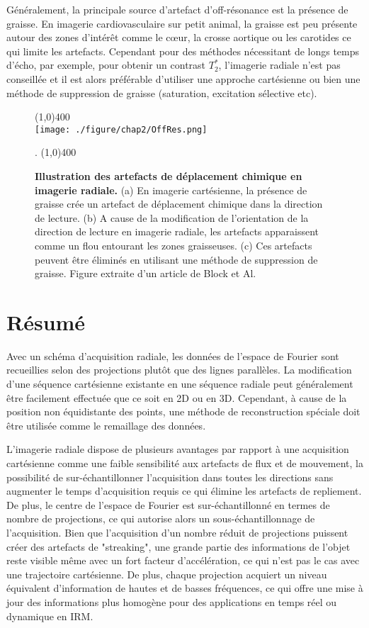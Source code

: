 Généralement, la principale source d'artefact d'off-résonance est la présence de graisse. En imagerie cardiovasculaire sur petit animal, la graisse est peu présente autour des zones d'intérêt comme le cœur, la crosse aortique ou les carotides ce qui limite les artefacts. Cependant pour des méthodes nécessitant de longs temps d'écho, par exemple, pour obtenir un contrast $T_2^*$, l'imagerie radiale n'est pas conseillée et il est alors préférable d'utiliser une approche cartésienne ou bien une méthode de suppression de graisse (saturation, excitation sélective etc).
\begin{figure}[H]
\centering
\line(1,0){400} \\
\texttt{[image: ./figure/chap2/OffRes.png]}
\caption[Illustration des artefacts de déplacement chimique en imagerie radiale.]{\label{fig:OffRes}  \textbf{Illustration des artefacts de déplacement chimique en imagerie radiale.}
(a) En imagerie cartésienne, la présence de graisse crée un artefact de déplacement chimique dans la direction de lecture. (b) A cause de la modification de l'orientation de la direction de lecture en imagerie radiale, les artefacts apparaissent comme un flou entourant les zones graisseuses. (c) Ces artefacts peuvent être éliminés en utilisant une méthode de suppression de graisse. Figure extraite d'un article de Block et Al. \cite{block2014towards}}.
\line(1,0){400} \\
\end{figure}

\section{Résumé}

Avec un schéma d'acquisition radiale, les données de l'espace de Fourier sont recueillies selon des projections plutôt que des lignes parallèles. La modification d'une séquence cartésienne existante en une séquence radiale peut généralement être facilement effectuée que ce soit en 2D ou en 3D. Cependant, à cause de la position non équidistante des points, une méthode de reconstruction spéciale doit être utilisée comme le remaillage des données.

L'imagerie radiale dispose de plusieurs avantages par rapport à une acquisition cartésienne comme une faible sensibilité aux artefacts de flux et de mouvement, la possibilité de sur-échantillonner l'acquisition dans toutes les directions sans augmenter le temps d'acquisition requis ce qui élimine les artefacts de repliement. De plus, le centre de l'espace de Fourier est sur-échantillonné en termes de nombre de projections, ce qui autorise alors un sous-échantillonnage de l'acquisition. Bien que l'acquisition d'un nombre réduit de projections puissent créer des artefacts de "streaking", une grande partie des informations de l'objet reste visible même avec un fort facteur d'accélération, ce qui n'est pas le cas avec une trajectoire cartésienne. De plus, chaque projection acquiert un niveau équivalent d'information de hautes et de basses fréquences, ce qui offre une mise à jour des informations plus homogène pour des applications en temps réel ou dynamique en IRM.

